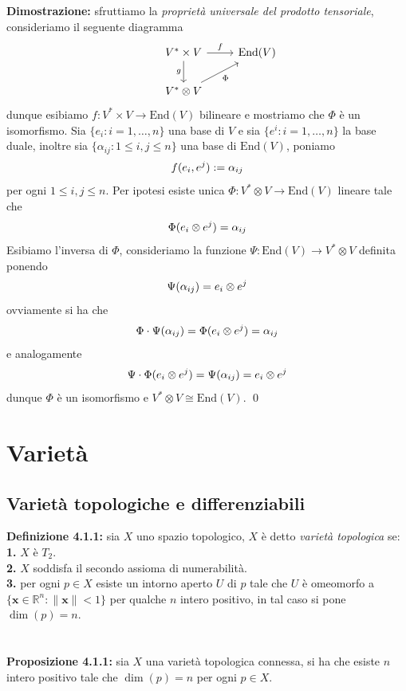 \documentclass{article}
\begin{document}
\textbf{Dimostrazione:} sfruttiamo la \textit{proprietà universale del prodotto tensoriale}, consideriamo il seguente diagramma \\
\[
\begin{tikzcd}
&V^* \times V \arrow[r,"f"] \arrow[d,"g", swap] & \mathrm{End}(V) \\
&V^* \otimes V \arrow[ur, "\Phi", swap] 
\end{tikzcd}
\]
dunque esibiamo $f : V^* \times V \longrightarrow \mathrm{End}(V)$ bilineare e mostriamo che
$\Phi$ è un isomorfismo. Sia $\{ e_i : i = 1, \dots, n \}$ una base di $V$ e sia $\{ e^i : i = 1, \dots, n \}$ la base duale, inoltre sia $\{ \alpha_{ij} : 1 \leq i, j \leq n \}$ una base di $\mathrm{End}(V)$, poniamo
\begin{gather}
    f(e_i, e^j) := \alpha_{ij} \notag
\end{gather}
per ogni $1 \leq i, j \leq n$. Per ipotesi esiste unica $\Phi : V^* \otimes V \longrightarrow \mathrm{End}(V)$ lineare tale che
\begin{gather}
    \Phi(e_i \otimes e^j) = \alpha_{ij} \notag
\end{gather}
Esibiamo l'inversa di $\Phi$, consideriamo la funzione $\Psi : \mathrm{End}(V) \longrightarrow V^* \otimes V$ definita ponendo
\begin{gather}
    \Psi (\alpha_{ij}) = e_i \otimes e^j \notag
\end{gather}
ovviamente si ha che
\begin{gather}
    \Phi \cdot \Psi (\alpha_{ij}) = \Phi (e_i \otimes e^j) = \alpha_{ij} \notag
\end{gather}
e analogamente
\begin{gather}
    \Psi \cdot \Phi (e_i \otimes e^j) = \Psi(\alpha_{ij}) = e_i \otimes e^j \notag
\end{gather}
dunque $\Phi$ è un isomorfismo e $V^* \otimes V \cong \mathrm{End}(V)$. \qed

\newpage
\section{Varietà}
\subsection{Varietà topologiche e differenziabili}
\textbf{Definizione 4.1.1:} sia $X$ uno spazio topologico, $X$ è detto \textit{varietà topologica} se: \\
\textbf{1.} $X$ è $T_2$. \\
\textbf{2.} $X$ soddisfa il secondo assioma di numerabilità. \\
\textbf{3.} per ogni $p \in X$ esiste un intorno aperto $U$ di $p$ tale che $U$ è omeomorfo a $\{ \mathbf{x} \in \mathbb{R}^n : \| \mathbf{x} \| < 1 \}$ per qualche $n$ intero positivo, in tal caso si pone $\dim (p) = n$. \\ \\ \\
\textbf{Proposizione 4.1.1:} sia $X$ una varietà topologica connessa, si ha che esiste $n$ intero positivo tale che $\dim (p) = n$ per ogni $p \in X$. \\
\end{document}
